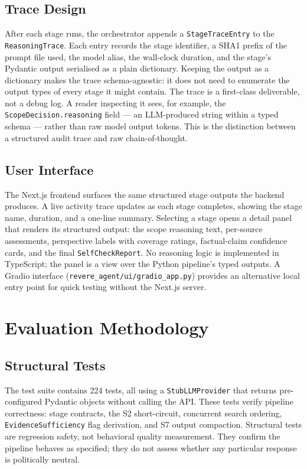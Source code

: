 \documentclass[11pt,letterpaper]{article}
\newcommand{\code}[1]{\texttt{\small #1}}
\newcommand{\file}[1]{\texttt{\small #1}}
\begin{document}
\subsection{Trace Design}

After each stage runs, the orchestrator appends a \code{StageTraceEntry} to
the \code{ReasoningTrace}. Each entry records the stage identifier, a SHA1
prefix of the prompt file used, the model alias, the wall-clock duration, and
the stage's Pydantic output serialised as a plain dictionary. Keeping the
output as a dictionary makes the trace schema-agnostic: it does not need to
enumerate the output types of every stage it might contain. The trace is a
first-class deliverable, not a debug log. A reader inspecting it sees, for
example, the \code{ScopeDecision.reasoning} field --- an LLM-produced string
within a typed schema --- rather than raw model output tokens. This is the
distinction between a structured audit trace and raw chain-of-thought.

\subsection{User Interface}

The Next.js frontend surfaces the same structured stage outputs the backend
produces. A live activity trace updates as each stage completes, showing the
stage name, duration, and a one-line summary. Selecting a stage opens a detail
panel that renders its structured output: the scope reasoning text, per-source
assessments, perspective labels with coverage ratings, factual-claim confidence
cards, and the final \code{SelfCheckReport}. No reasoning logic is implemented
in TypeScript; the panel is a view over the Python pipeline's typed outputs.
A Gradio interface (\file{revere\_agent/ui/gradio\_app.py}) provides an
alternative local entry point for quick testing without the Next.js server.


\section{Evaluation Methodology}
\label{sec:eval}

\subsection{Structural Tests}

The test suite contains 224 tests, all using a
\code{StubLLMProvider} that returns pre-configured Pydantic objects without
calling the API. These tests verify pipeline correctness: stage contracts,
the S2 short-circuit, concurrent search ordering, \code{EvidenceSufficiency}
flag derivation, and S7 output compaction. Structural tests are regression
safety, not behavioral quality measurement. They confirm the pipeline behaves
as specified; they do not assess whether any particular response is politically
neutral.
\end{document}
